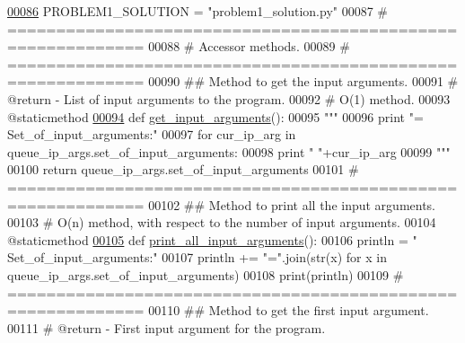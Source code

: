\begin{DoxyCode}
\hypertarget{queue__ip__arguments_8py_source_l00086}{}\hyperlink{classutilities_1_1queue__ip__arguments_1_1queue__ip__args_ad61d6e7f7e2602c0f1c11a8fdf2b7168}{00086}     PROBLEM1\_SOLUTION = \textcolor{stringliteral}{"problem1\_solution.py"}
00087     \textcolor{comment}{# ============================================================}
00088     \textcolor{comment}{#   Accessor methods.}
00089     \textcolor{comment}{# ============================================================}
00090     \textcolor{comment}{##  Method to get the input arguments.}
00091     \textcolor{comment}{#   @return - List of input arguments to the program.}
00092     \textcolor{comment}{#   O(1) method.}
00093     @staticmethod
\hypertarget{queue__ip__arguments_8py_source_l00094}{}\hyperlink{classutilities_1_1queue__ip__arguments_1_1queue__ip__args_abeea0f35fe270bfe53f359fd8e85c3e0}{00094}     \textcolor{keyword}{def }\hyperlink{classutilities_1_1queue__ip__arguments_1_1queue__ip__args_abeea0f35fe270bfe53f359fd8e85c3e0}{get\_input\_arguments}():
00095         \textcolor{stringliteral}{"""}
00096 \textcolor{stringliteral}{        print "=    Set\_of\_input\_arguments:"}
00097 \textcolor{stringliteral}{        for cur\_ip\_arg in queue\_ip\_args.set\_of\_input\_arguments:}
00098 \textcolor{stringliteral}{            print " "+cur\_ip\_arg}
00099 \textcolor{stringliteral}{        """}
00100         \textcolor{keywordflow}{return} queue\_ip\_args.set\_of\_input\_arguments
00101     \textcolor{comment}{# ============================================================}
00102     \textcolor{comment}{##  Method to print all the input arguments.}
00103     \textcolor{comment}{#   O(n) method, with respect to the number of input arguments.}
00104     @staticmethod
\hypertarget{queue__ip__arguments_8py_source_l00105}{}\hyperlink{classutilities_1_1queue__ip__arguments_1_1queue__ip__args_a85480b443e2538123e8531852f9035c9}{00105}     \textcolor{keyword}{def }\hyperlink{classutilities_1_1queue__ip__arguments_1_1queue__ip__args_a85480b443e2538123e8531852f9035c9}{print\_all\_input\_arguments}():
00106         println = \textcolor{stringliteral}{"~    Set\_of\_input\_arguments:"}
00107         println += \textcolor{stringliteral}{"="}.join(str(x) \textcolor{keywordflow}{for} x \textcolor{keywordflow}{in} queue\_ip\_args.set\_of\_input\_arguments)
00108         print(println)
00109     \textcolor{comment}{# ============================================================}
00110     \textcolor{comment}{##  Method to get the first input argument.}
00111     \textcolor{comment}{#   @return - First input argument for the program.}

\end{DoxyCode}
